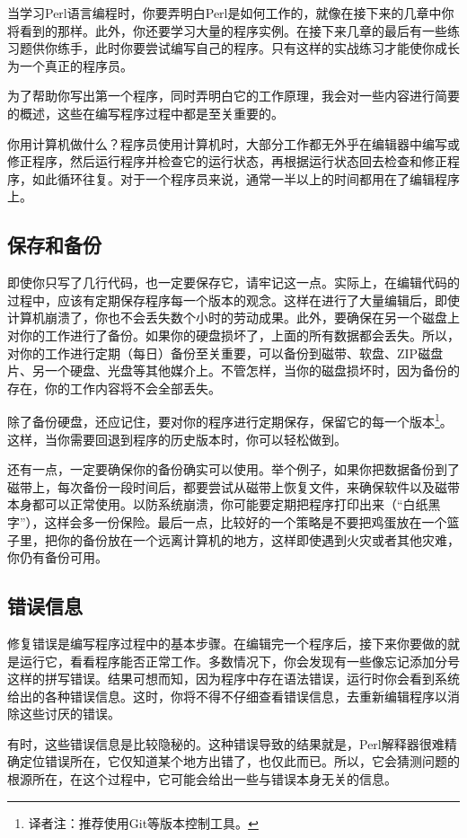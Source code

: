 当学习Perl语言编程时，你要弄明白Perl是如何工作的，就像在接下来的几章中你将看到的那样。此外，你还要学习大量的程序实例。在接下来几章的最后有一些练习题供你练手，此时你要尝试编写自己的程序。只有这样的实战练习才能使你成长为一个真正的程序员。

为了帮助你写出第一个程序，同时弄明白它的工作原理，我会对一些内容进行简要的概述，这些在编写程序过程中都是至关重要的。

你用计算机做什么？程序员使用计算机时，大部分工作都无外乎在编辑器中编写或修正程序，然后运行程序并检查它的运行状态，再根据运行状态回去检查和修正程序，如此循环往复。对于一个程序员来说，通常一半以上的时间都用在了编辑程序上。

\subsection{保存和备份}
即使你只写了几行代码，也一定要保存它，请牢记这一点。实际上，在编辑代码的过程中，应该有定期保存程序每一个版本的观念。这样在进行了大量编辑后，即使计算机崩溃了，你也不会丢失数个小时的劳动成果。此外，要确保在另一个磁盘上对你的工作进行了备份。如果你的硬盘损坏了，上面的所有数据都会丢失。所以，对你的工作进行定期（每日）备份至关重要，可以备份到磁带、软盘、ZIP磁盘片、另一个硬盘、光盘等其他媒介上。不管怎样，当你的磁盘损坏时，因为备份的存在，你的工作内容将不会全部丢失。

除了备份硬盘，还应记住，要对你的程序进行定期保存，保留它的每一个版本\footnote{译者注：推荐使用Git等版本控制工具。}。这样，当你需要回退到程序的历史版本时，你可以轻松做到。

还有一点，一定要确保你的备份确实可以使用。举个例子，如果你把数据备份到了磁带上，每次备份一段时间后，都要尝试从磁带上恢复文件，来确保软件以及磁带本身都可以正常使用。以防系统崩溃，你可能要定期把程序打印出来（“白纸黑字”），这样会多一份保险。最后一点，比较好的一个策略是不要把鸡蛋放在一个篮子里，把你的备份放在一个远离计算机的地方，这样即使遇到火灾或者其他灾难，你仍有备份可用。

\subsection{错误信息}
修复错误是编写程序过程中的基本步骤。在编辑完一个程序后，接下来你要做的就是运行它，看看程序能否正常工作。多数情况下，你会发现有一些像忘记添加分号这样的拼写错误。结果可想而知，因为程序中存在语法错误，运行时你会看到系统给出的各种错误信息。这时，你将不得不仔细查看错误信息，去重新编辑程序以消除这些讨厌的错误。

有时，这些错误信息是比较隐秘的。这种错误导致的结果就是，Perl解释器很难精确定位错误所在，它仅知道某个地方出错了，也仅此而已。所以，它会猜测问题的根源所在，在这个过程中，它可能会给出一些与错误本身无关的信息。

